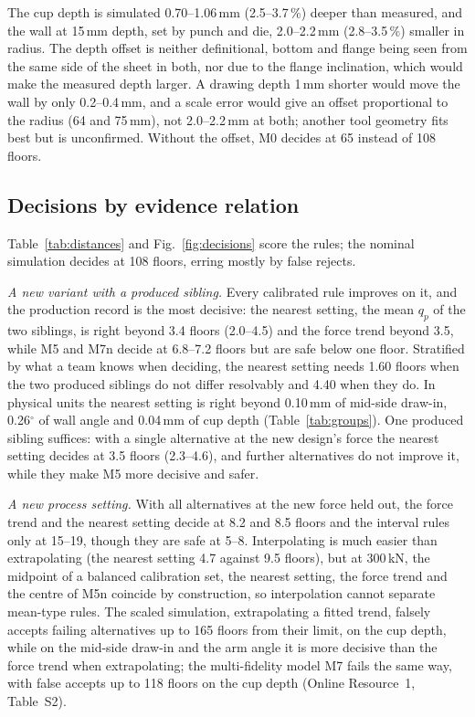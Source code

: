 \documentclass[pdflatex,sn-basic,lineno]{sn-jnl}
\newcommand{\ORt}[1]{Online Resource~1, Table~S#1}
\begin{document}
The cup depth is simulated 0.70--1.06\,mm (2.5--3.7\,\%) deeper than measured, and the wall at 15\,mm depth, set by punch and die, 2.0--2.2\,mm (2.8--3.5\,\%) smaller in radius. The depth offset is neither definitional, bottom and flange being seen from the same side of the sheet in both, nor due to the flange inclination, which would make the measured depth larger. A drawing depth 1\,mm shorter would move the wall by only 0.2--0.4\,mm, and a scale error would give an offset proportional to the radius (64 and 75\,mm), not 2.0--2.2\,mm at both; another tool geometry fits best but is unconfirmed. Without the offset, M0 decides at 65 instead of 108 floors.

\subsection{Decisions by evidence relation}\label{sec:res-decisions}

Table~\ref{tab:distances} and Fig.~\ref{fig:decisions} score the rules; the nominal simulation decides at 108 floors, erring mostly by false rejects.

\emph{A new variant with a produced sibling.} Every calibrated rule improves on it, and the production record is the most decisive: the nearest setting, the mean $q_p$ of the two siblings, is right beyond 3.4 floors (2.0--4.5) and the force trend beyond 3.5, while M5 and M7n decide at 6.8--7.2 floors but are safe below one floor. Stratified by what a team knows when deciding, the nearest setting needs 1.60 floors when the two produced siblings do not differ resolvably and 4.40 when they do. In physical units the nearest setting is right beyond 0.10\,mm of mid-side draw-in, 0.26$^\circ$ of wall angle and 0.04\,mm of cup depth (Table~\ref{tab:groups}). One produced sibling suffices: with a single alternative at the new design's force the nearest setting decides at 3.5 floors (2.3--4.6), and further alternatives do not improve it, while they make M5 more decisive and safer.

\emph{A new process setting.} With all alternatives at the new force held out, the force trend and the nearest setting decide at 8.2 and 8.5 floors and the interval rules only at 15--19, though they are safe at 5--8. Interpolating is much easier than extrapolating (the nearest setting 4.7 against 9.5 floors), but at 300\,kN, the midpoint of a balanced calibration set, the nearest setting, the force trend and the centre of M5n coincide by construction, so interpolation cannot separate mean-type rules. The scaled simulation, extrapolating a fitted trend, falsely accepts failing alternatives up to 165 floors from their limit, on the cup depth, while on the mid-side draw-in and the arm angle it is more decisive than the force trend when extrapolating; the multi-fidelity model M7 fails the same way, with false accepts up to 118 floors on the cup depth (\ORt{2}).
\end{document}
